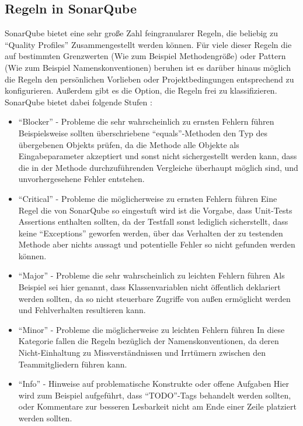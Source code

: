 \documentclass[da,ngerman]{stthesis}
\begin{document}
			\subsection{Regeln in SonarQube}
			SonarQube bietet eine sehr große Zahl feingranularer Regeln, die beliebig zu "`Quality Profiles"' Zusammengestellt werden können. Für viele dieser Regeln die auf bestimmten Grenzwerten (Wie zum Beispiel Methodengröße) oder Pattern (Wie zum Beispiel Namenskonventionen) beruhen ist es darüber hinaus möglich die Regeln den persönlichen Vorlieben oder Projektbedingungen entsprechend zu konfigurieren. Außerdem gibt es die Option, die Regeln frei zu klassifizieren. \newline
			SonarQube bietet dabei folgende Stufen \cite{SonarRuleSeverities}: 
			\begin{itemize}
				\item "`Blocker"' - Probleme die sehr wahrscheinlich zu ernsten Fehlern führen \newline
				Beispielsweise sollten überschriebene "`equals"'-Methoden den Typ des übergebenen Objekts prüfen, da die Methode alle Objekte als Eingabeparameter akzeptiert und sonst nicht sichergestellt werden kann, dass die in der Methode durchzuführenden Vergleiche überhaupt möglich sind, und unvorhergesehene Fehler entstehen.
				\item "`Critical"' - Probleme die möglicherweise zu ernsten Fehlern führen \newline
				Eine Regel die von SonarQube so eingestuft wird ist die Vorgabe, dass Unit-Tests Assertions enthalten sollten, da der Testfall sonst lediglich sicherstellt, dass keine "`Exceptions"' geworfen werden, über das Verhalten der zu testenden Methode aber nichts aussagt und potentielle Fehler so nicht gefunden werden können. 
				\item "`Major"' - Probleme die sehr wahrscheinlich zu leichten Fehlern führen \newline
				Als Beispiel sei hier genannt, dass Klassenvariablen nicht öffentlich deklariert werden sollten, da so nicht steuerbare Zugriffe von außen ermöglicht werden und Fehlverhalten resultieren kann.
				\item "`Minor"' - Probleme die möglicherweise zu leichten Fehlern führen \newline
				In diese Kategorie fallen die Regeln bezüglich der Namenskonventionen, da deren Nicht-Einhaltung zu Missverständnissen und Irrtümern zwischen den Teammitgliedern führen kann.
				\item "`Info"' - Hinweise auf problematische Konstrukte oder offene Aufgaben \newline
				Hier wird zum Beispiel aufgeführt, dass "`TODO"'-Tags behandelt werden sollten, oder Kommentare zur besseren Lesbarkeit nicht am Ende einer Zeile platziert werden sollten.
			\end{itemize}
\end{document}
